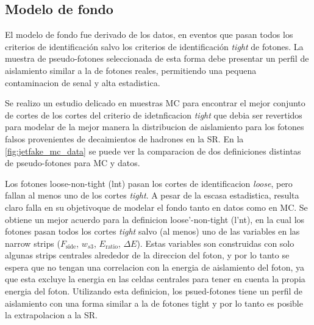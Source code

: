\subsection{Modelo de fondo} \label{sec:jfake_bkg_template}

El modelo de fondo fue derivado de los datos, en eventos que pasan todos los
criterios de identificación salvo los criterios de identificación \emph{tight}
de fotones. La muestra de pseudo-fotones seleccionada de esta forma debe
presentar un perfil de aislamiento similar a la de fotones reales, permitiendo
una pequena contaminacion de senal y alta estadistica.

Se realizo un estudio delicado en muestras MC para encontrar el mejor conjunto de cortes
de los cortes del criterio de idetnficacion \emph{tight} que debia ser revertidos para
modelar de la mejor manera la distribucion de aislamiento para los fotones falsos provenientes
de decaimientos de hadrones en la SR. En la \cref{fig:jetfake_mc_data} se puede ver la comparacion
de dos definiciones distintas de pseudo-fotones para MC y datos.



Los fotones loose-non-tight (lnt) pasan los cortes de identificacion
\emph{loose}, pero fallan al menos uno de los cortes \emph{tight}. A pesar de la
escasa estadistica, resulta claro falla en su objetivoque de modelar el fondo
tanto en datos como en MC. Se obtiene un mejor acuerdo para la definicion
loose'-non-tight (l'nt), en la cual los fotones pasan todos los cortes
\emph{tight} salvo (al menos) uno de las variables en las narrow strips
($F_\text{side}$, $w_{s3}$, $E_\text{ratio}$, $\Delta E$). Estas variables son
construidas con solo algunas strips centrales alrededor de la direccion del
foton, y por lo tanto se espera que no tengan una correlacion con la energia de
aislamiento del foton, ya que esta excluye la energia en las celdas centrales
para tener en cuenta la propia energia del foton. Utilizando esta definicion,
los psued-fotones tiene un perfil de aislamiento con una forma similar a la de
fotones tight y por lo tanto es posible la extrapolacion a la SR.

